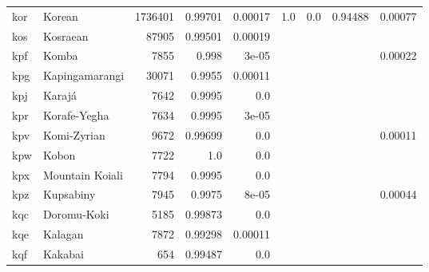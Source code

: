 \documentclass[11pt]{article}
\begin{document}
\begin{table*}[h]
{\begin{tabular}{llrrrrrrr}
kor         & Korean         & 1736401         & 0.99701         & 0.00017         & 1.0         & 0.0         & 0.94488         & 0.00077         \\

kos         & Kosraean         & 87905         & 0.99501         & 0.00019         &          &          &          &          \\

kpf         & Komba         & 7855         & 0.998         & 3e-05         &          &          &          & 0.00022         \\

kpg         & Kapingamarangi         & 30071         & 0.9955         & 0.00011         &          &          &          &          \\

kpj         & Karajá         & 7642         & 0.9995         & 0.0         &          &          &          &          \\

kpr         & Korafe-Yegha         & 7634         & 0.9995         & 3e-05         &          &          &          &          \\

kpv         & Komi-Zyrian         & 9672         & 0.99699         & 0.0         &          &          &          & 0.00011         \\

kpw         & Kobon         & 7722         & 1.0         & 0.0         &          &          &          &          \\

kpx         & Mountain Koiali         & 7794         & 0.9995         & 0.0         &          &          &          &          \\

kpz         & Kupsabiny         & 7945         & 0.9975         & 8e-05         &          &          &          & 0.00044         \\

kqc         & Doromu-Koki         & 5185         & 0.99873         & 0.0         &          &          &          &          \\

kqe         & Kalagan         & 7872         & 0.99298         & 0.00011         &          &          &          &          \\

kqf         & Kakabai         & 654         & 0.99487         & 0.0         &          &          &          &          \\


\end{tabular}}
\end{table*}
\end{document}
